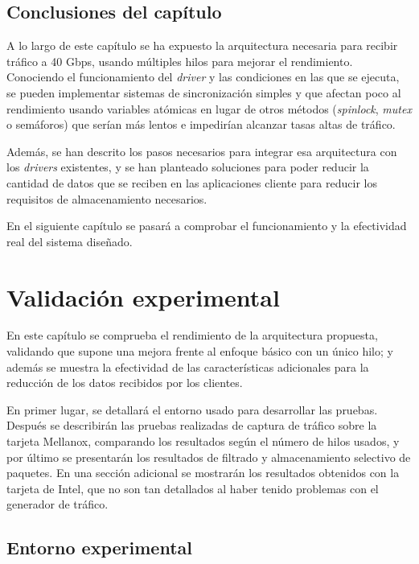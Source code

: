 \documentclass[twoside, 12pt]{epstfg}
\begin{document}
\section{Conclusiones del capítulo}

A lo largo de este capítulo se ha expuesto la arquitectura necesaria para recibir tráfico a 40 Gbps, usando múltiples hilos para mejorar el rendimiento. Conociendo el funcionamiento del \textit{driver} y las condiciones en las que se ejecuta, se pueden implementar sistemas de sincronización simples y que afectan poco al rendimiento usando variables atómicas en lugar de otros métodos (\textit{spinlock}, \textit{mutex} o semáforos) que serían más lentos e impedirían alcanzar tasas altas de tráfico.

Además, se han descrito los pasos necesarios para integrar esa arquitectura con los \textit{drivers} existentes, y se han planteado soluciones para poder reducir la cantidad de datos que se reciben en las aplicaciones cliente para reducir los requisitos de almacenamiento necesarios.

En el siguiente capítulo se pasará a comprobar el funcionamiento y la efectividad real del sistema diseñado.

\chapter{Validación experimental}
\label{chap:Validacion}

En este capítulo se comprueba el rendimiento de la arquitectura propuesta, validando que supone una mejora frente al enfoque básico con un único hilo; y además se muestra la efectividad de las características adicionales para la reducción de los datos recibidos por los clientes.

En primer lugar, se detallará el entorno usado para desarrollar las pruebas. Después se describirán las pruebas realizadas de captura de tráfico sobre la tarjeta Mellanox, comparando los resultados según el número de hilos usados, y por último se presentarán los resultados de filtrado y almacenamiento selectivo de paquetes. En una sección adicional se mostrarán los resultados obtenidos con la tarjeta de Intel, que no son tan detallados al haber tenido problemas con el generador de tráfico.

\section{Entorno experimental}
\label{sec:Validacion:Entorno}
\end{document}
